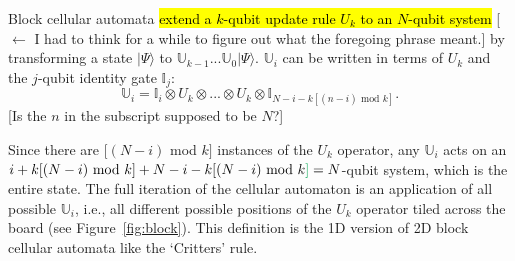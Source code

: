 \documentclass[11pt]{article}
\newcommand{\nicole}[1]{{\color{Green}#1}}
\begin{document}
\begin{multicols}{2}
Block cellular automata \hl{extend a $k$-qubit update rule $U_k$ to an $N$-qubit system}
\nicole{[$\leftarrow$ I had to think for a while to figure out what the foregoing phrase meant.]}
by transforming a state $|\Psi\rangle$ to $\mathbb{U}_{k-1} ... \mathbb{U}_0 | \Psi \rangle $. 
$\mathbb{U}_i$ can be written in terms of $U_k$ and the $j$-qubit identity gate $\mathbb{I}_j$:
$$\mathbb{U}_i = \mathbb{I}_i \otimes U_k \otimes ... \otimes U_k \otimes \mathbb{I}_{N-i-k[(n-i) \text{ mod } k]}. $$
\nicole{[Is the $n$ in the subscript supposed to be $N$?]}

Since there are $[(N-i)$ mod $k]$ instances of the $U_k$ operator, 
any $\mathbb{U}_i$ acts on an $i + k[(N-i) \text{ mod } k] + N-i-k[(N-i) \text{ mod } k \nicole{]} = N$-qubit system, which is the entire state. The full iteration of the cellular automaton is an application of all possible $\mathbb{U}_i$, i.e., all different possible positions of the $U_k$ operator tiled across the board (see Figure~\ref{fig:block}). This definition is the 1D version of 2D block cellular automata like the `Critters' rule.


\end{multicols}
\end{document}
